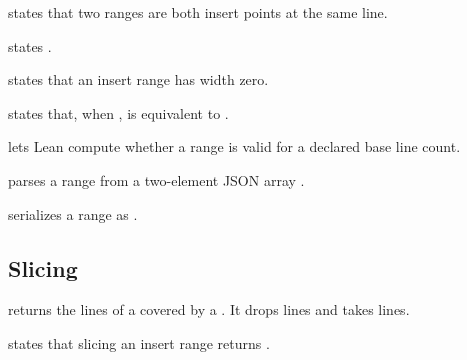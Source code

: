 \begin{definition}
 states that two ranges are both insert
points at the same line.
\end{definition}

\begin{theorem}
 states
.
\end{theorem}

\begin{theorem}
 states that an insert range has width
zero.
\end{theorem}

\begin{theorem}
 states that, when
,  is equivalent to
.
\end{theorem}

\begin{definition}
 lets Lean compute whether a range is valid
for a declared base line count.
\end{definition}

\begin{definition}
 parses a range from a two-element JSON array
.
\end{definition}

\begin{definition}
 serializes a range as .
\end{definition}

\subsection{Slicing}

\begin{definition}[slice]
\code{[slice]} returns the lines of a  covered by a
. It drops  lines and takes
 lines.
\end{definition}

\begin{theorem}
 states that slicing an insert range returns
\code{[]}.
\end{theorem}

